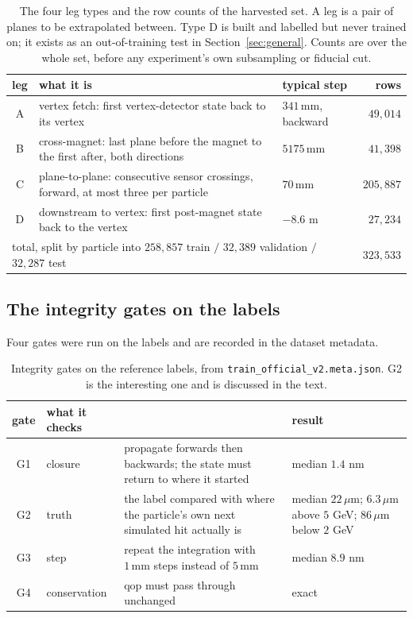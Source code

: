 \documentclass[11pt,a4paper]{article}
\newcommand{\um}{\ensuremath{\,\mu\mathrm{m}}}
\newcommand{\mm}{\ensuremath{\,\mathrm{mm}}}
\newcommand{\qop}{\ensuremath{\mathrm{qop}}}
\begin{document}
\begin{table}[tbp]
  \centering
  \caption{The four leg types and the row counts of the harvested set. A leg is
  a pair of planes to be extrapolated between. Type D is built and labelled but
  never trained on; it exists as an out-of-training test in
  Section~\ref{sec:general}. Counts are over the whole set, before any
  experiment's own subsampling or fiducial cut.}
  \label{tab:legs}
  \footnotesize
  \setlength{\tabcolsep}{4pt}
  \begin{tabular}{clp{2.0cm}r}
    \toprule
    leg & what it is & typical step & rows \\
    \midrule
    A & vertex fetch: first vertex-detector state back to its vertex
      & $341\mm$, backward & $49{,}014$ \\
    B & cross-magnet: last plane before the magnet to the first after,
        both directions & $5175\mm$ & $41{,}398$ \\
    C & plane-to-plane: consecutive sensor crossings, forward, at most
        three per particle & $70\mm$ & $205{,}887$ \\
    D & downstream to vertex: first post-magnet state back to the vertex
      & $-8.6$ m & $27{,}234$ \\
    \midrule
    \multicolumn{3}{l}{total, split by particle into
      $258{,}857$ train $/$ $32{,}389$ validation $/$ $32{,}287$ test}
      & $323{,}533$ \\
    \bottomrule
  \end{tabular}
\end{table}

\subsection{The integrity gates on the labels}
\label{sec:gates}

Four gates were run on the labels and are recorded in the dataset metadata.

\begin{table}[tbp]
  \centering
  \caption{Integrity gates on the reference labels, from
  \texttt{train\_official\_v2.meta.json}. G2 is the interesting one and is
  discussed in the text.}
  \label{tab:gates}
  \small
  \setlength{\tabcolsep}{4pt}
  \begin{tabular}{clp{5.6cm}p{3.5cm}}
    \toprule
    gate & what it checks & & result \\
    \midrule
    G1 & closure & propagate forwards then backwards; the state must return to
         where it started & median $1.4$ nm \\
    G2 & truth & the label compared with where the particle's own next
         simulated hit actually is & median $22\um$; $6.3\um$ above $5$ GeV;
         $86\um$ below $2$ GeV \\
    G3 & step & repeat the integration with $1\mm$ steps instead of $5\mm$ &
         median $8.9$ nm \\
    G4 & conservation & $\qop$ must pass through unchanged & exact \\
    \bottomrule
  \end{tabular}
\end{table}
\end{document}
